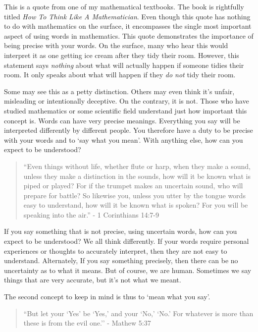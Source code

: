 \documentclass[10pt]{article}
\begin{document}
\begin{multicols}{2}
This is a quote from one of my mathematical textbooks. The book is rightfully titled \textit{How To Think Like A Mathematician}. Even though this quote has nothing to do with mathematics on the surface, it encompasses the single most important aspect of using words in mathematics. This quote demonstrates the importance of being precise with your words. On the surface, many who hear this would interpret it as one getting ice cream after they tidy their room. However, this statement says \textit{nothing} about what will actually happen if someone tidies their room. It only speaks about what will happen if they \textit{do not} tidy their room.

Some may see this as a petty distinction. Others may even think it's unfair, misleading or intentionally deceptive. On the contrary, it is not. Those who have studied mathematics or some scientific field understand just how important this concept is. Words can have very precise meanings. Everything you say will be interpreted differently by different people. You therefore have a duty to be precise with your words and to `say what you mean'. With anything else, how can you expect to be understood?

\begin{quotation}
``Even things without life, whether flute or harp, when they make a sound, unless they make a distinction in the sounds, how will it be known what is piped or played? For if the trumpet makes an uncertain sound, who will prepare for battle? So likewise you, unless you utter by the tongue words easy to understand, how will it be known what is spoken? For you will be speaking into the air.'' - 1 Corinthians 14:7-9 
\end{quotation}

If you say something that is not precise, using uncertain words, how can you expect to be understood? We all think differently. If your words require personal experiences or thoughts to accurately interpret, then they are not easy to understand. Alternately, If you say something precisely, then there can be no uncertainty as to what it means. But of course, we are human. Sometimes we say things that are very accurate, but it's not what we meant.

The second concept to keep in mind is thus to `mean what you say'.

\begin{quotation}
``But let your `Yes’ be `Yes,’ and your `No,’ `No.’ For whatever is more than these is from the evil one.'' - Mathew 5:37
\end{quotation}


\end{multicols}
\end{document}
